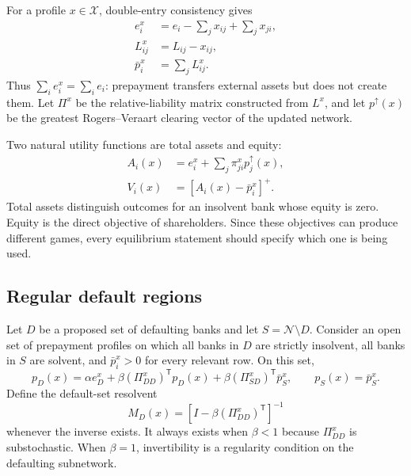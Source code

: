 \documentclass[11pt]{article}
\theoremstyle{definition}
\theoremstyle{remark}
\newcommand{\N}{\mathcal{N}}
\newcommand{\pbar}{\bar p}
\newcommand{\pos}[1]{\left[#1\right]^+}
\begin{document}
For a profile $x\in\mathcal X$, double-entry consistency gives
\begin{align}
  e_i^x
    &=e_i-\sum_jx_{ij}+\sum_jx_{ji},
      \label{eq:updated-assets}\\
  L_{ij}^x
    &=L_{ij}-x_{ij},
      \label{eq:updated-liabilities}\\
  \pbar_i^x
    &=\sum_jL_{ij}^x.
      \label{eq:updated-total-liabilities}
\end{align}
Thus $\sum_i e_i^x=\sum_i e_i$: prepayment transfers external assets but does
not create them.  Let $\Pi^x$ be the relative-liability matrix constructed
from $L^x$, and let $p^\uparrow(x)$ be the greatest Rogers--Veraart clearing
vector of the updated network.

Two natural utility functions are total assets and equity:
\begin{align}
  A_i(x)
    &=e_i^x+\sum_j\pi_{ji}^x p_j^\uparrow(x),
      \label{eq:total-asset-utility}\\
  V_i(x)
    &=\pos{A_i(x)-\pbar_i^x}.
      \label{eq:equity-utility}
\end{align}
Total assets distinguish outcomes for an insolvent bank whose equity is zero.
Equity is the direct objective of shareholders.  Since these objectives can
produce different games, every equilibrium statement should specify which one
is being used.

\subsection{Regular default regions}

Let $D$ be a proposed set of defaulting banks and let $S=\N\setminus D$.
Consider an open set of prepayment profiles on which all banks in $D$ are
strictly insolvent, all banks in $S$ are solvent, and
$\pbar_i^x>0$ for every relevant row.  On this set,
\begin{equation}\label{eq:default-cell-system}
  p_D(x)
  =\alpha e_D^x
   +\beta(\Pi_{DD}^x)^{\mathsf T}p_D(x)
   +\beta(\Pi_{SD}^x)^{\mathsf T}\pbar_S^x,
  \qquad
  p_S(x)=\pbar_S^x.
\end{equation}
Define the default-set resolvent
\begin{equation}\label{eq:default-resolvent}
  M_D(x)=
  \left[I-\beta(\Pi_{DD}^x)^{\mathsf T}\right]^{-1}
\end{equation}
whenever the inverse exists.  It always exists when $\beta<1$ because
$\Pi_{DD}^x$ is substochastic.  When $\beta=1$, invertibility is a regularity
condition on the defaulting subnetwork.
\end{document}
